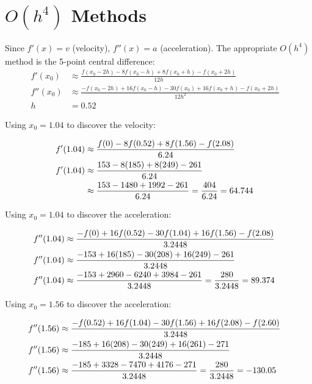 \section{$O(h^{4})$ Methods}

	Since $f'(x) = v$ (velocity), $f''(x) = a$ (acceleration). The appropriate $O(h^{4})$ method is the 5-point central difference:
	\begin{align}
		f'(x_{0}) &\approx \frac{f(x_{0}-2h)-8f(x_{0}-h)+8f(x_{0}+h)-f(x_{0}+2h)}{12h}& \\
		f''(x_{0}) &\approx \frac{-f(x_{0}-2h)+16f(x_{0}-h)-30f(x_{0})+16f(x_{0}+h)-f(x_{0}+2h)}{12h^{2}}& \\
		h &= 0.52&
	\end{align}

	Using $x_{0} = 1.04$ to discover the velocity:

	\begin{align}
		f'(1.04) &\approx \frac{f(0)-8f(0.52)+8f(1.56)-f(2.08)}{6.24}& \\
		f'(1.04) &\approx \frac{153-8(185)+8(249)-261}{6.24}& \notag \\
		&\approx \frac{153-1480+1992-261}{6.24} = \frac{404}{6.24} = 64.744&
	\end{align}

	Using $x_{0} = 1.04$ to discover the acceleration:

	\begin{align}
		f''(1.04) &\approx \frac{-f(0)+16f(0.52)-30f(1.04)+16f(1.56)-f(2.08)}{3.2448}& \\
		f''(1.04) &\approx \frac{-153+16(185)-30(208)+16(249)-261}{3.2448}& \notag \\
		f''(1.04) &\approx \frac{-153+2960-6240+3984-261}{3.2448} = \frac{280}{3.2448} = 89.374&
	\end{align}

	Using $x_{0} = 1.56$ to discover the acceleration:

	\begin{align}
		f''(1.56) &\approx \frac{-f(0.52)+16f(1.04)-30f(1.56)+16f(2.08)-f(2.60)}{3.2448}& \\
		f''(1.56) &\approx \frac{-185+16(208)-30(249)+16(261)-271}{3.2448}& \notag \\
		f''(1.56) &\approx \frac{-185+3328-7470+4176-271}{3.2448} = \frac{280}{3.2448} = -130.05&
	\end{align}
